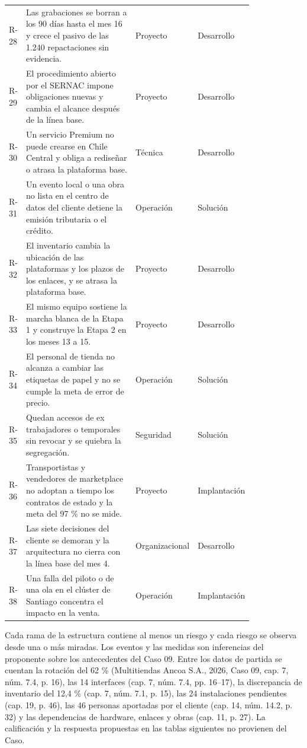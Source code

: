 \documentclass[11pt]{article}
\begin{document}
\begin{longtable}{p{0.060\linewidth}p{0.470\linewidth}p{0.140\linewidth}p{0.150\linewidth}}
R-28 & Las grabaciones se borran a los 90 días hasta el mes 16 y crece el pasivo de las 1.240 repactaciones sin evidencia. & Proyecto & Desarrollo \\
R-29 & El procedimiento abierto por el SERNAC impone obligaciones nuevas y cambia el alcance después de la línea base. & Proyecto & Desarrollo \\
R-30 & Un servicio Premium no puede crearse en Chile Central y obliga a rediseñar o atrasa la plataforma base. & Técnica & Desarrollo \\
R-31 & Un evento local o una obra no lista en el centro de datos del cliente detiene la emisión tributaria o el crédito. & Operación & Solución \\
R-32 & El inventario cambia la ubicación de las plataformas y los plazos de los enlaces, y se atrasa la plataforma base. & Proyecto & Desarrollo \\
R-33 & El mismo equipo sostiene la marcha blanca de la Etapa 1 y construye la Etapa 2 en los meses 13 a 15. & Proyecto & Desarrollo \\
R-34 & El personal de tienda no alcanza a cambiar las etiquetas de papel y no se cumple la meta de error de precio. & Operación & Solución \\
R-35 & Quedan accesos de ex trabajadores o temporales sin revocar y se quiebra la segregación. & Seguridad & Solución \\
R-36 & Transportistas y vendedores de marketplace no adoptan a tiempo los contratos de estado y la meta del 97 \% no se mide. & Proyecto & Implantación \\
R-37 & Las siete decisiones del cliente se demoran y la arquitectura no cierra con la línea base del mes 4. & Organizacional & Desarrollo \\
R-38 & Una falla del piloto o de una ola en el clúster de Santiago concentra el impacto en la venta. & Operación & Implantación \\
\end{longtable}

Cada rama de la estructura contiene al menos un riesgo y cada riesgo se observa desde una o más miradas. Los eventos y las medidas son inferencias del proponente sobre los antecedentes del Caso 09. Entre los datos de partida se cuentan la rotación del 62 \% (Multitiendas Ancoa S.A., 2026, Caso 09, cap. 7, núm. 7.4, p. 16), las 14 interfaces (cap. 7, núm. 7.4, pp. 16--17), la discrepancia de inventario del 12,4 \% (cap. 7, núm. 7.1, p. 15), las 24 instalaciones pendientes (cap. 19, p. 46), las 46 personas aportadas por el cliente (cap. 14, núm. 14.2, p. 32) y las dependencias de hardware, enlaces y obras (cap. 11, p. 27). La calificación y la respuesta propuestas en las tablas siguientes no provienen del Caso.
\end{document}
